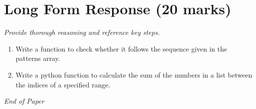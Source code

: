 \documentclass[12pt]{article}
\begin{document}
\section*{Long Form Response (20 marks)}
\textit{Provide thorough reasoning and reference key steps.}
\begin{enumerate}[label=\arabic*.]
\item Write a function to check whether it follows the sequence given in the patterns array.
\item Write a python function to calculate the sum of the numbers in a list between the indices
of a specified range.
\end{enumerate}

\vfill
\noindent\textit{End of Paper}
\end{document}
